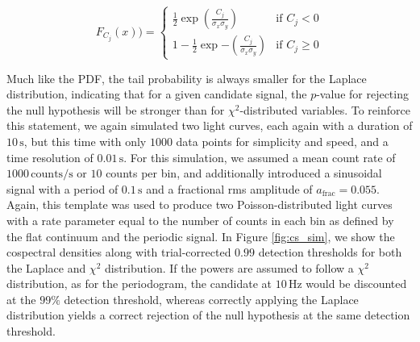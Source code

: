 \documentclass[12pt]{emulateapj}
\begin{document}
\begin{equation}
\label{eqn:cospectrum_cdf}
F_{C_j}(x)) = 
  \begin{cases} 
   \frac{1}{2} \exp{\left(\frac{C_j}{\sigma_x \sigma_y}\right)}  & \text{if } C_j < 0 \\
    1 - \frac{1}{2} \exp{-\left( \frac{C_j}{\sigma_x \sigma_y} \right)}   & \text{if } C_j \geq 0
  \end{cases}
\end{equation}

\noindent Much like the PDF, the tail probability is always smaller for the Laplace distribution, indicating that for a given candidate signal, the $p$-value for rejecting the null hypothesis will be stronger than for $\chi^2$-distributed variables. To reinforce this statement, we again simulated two light curves, each again with a duration of $10\,\mathrm{s}$, but this time with only $1000$ data points for simplicity and speed, and a time resolution of $0.01\,\mathrm{s}$. For this simulation, we assumed a mean count rate of $1000\,\mathrm{counts/s}$ or $10$ counts per bin, and additionally introduced a sinusoidal signal with a period of $0.1\,\mathrm{s}$ and a fractional rms amplitude of $a_\mathrm{frac} = 0.055$. Again, this template was used to produce two Poisson-distributed light curves with a rate parameter equal to the number of counts in each bin as defined by the flat continuum and the periodic signal. In Figure \ref{fig:cs_sim}, we show the cospectral densities along with trial-corrected $0.99$ detection thresholds for both the Laplace and $\chi^2$ distribution. If the powers are assumed to follow a $\chi^2$ distribution, as for the periodogram, the candidate at $10 \,\mathrm{Hz}$ would be discounted at the $99\%$ detection threshold, whereas correctly applying the Laplace distribution yields a correct rejection of the null hypothesis at the same detection threshold.
\end{document}
